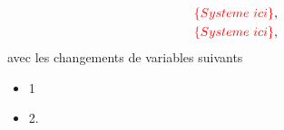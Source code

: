 \begin{subequations}
	\begin{align}
		\textcolor{red}{\{Systeme\ ici\}},\label{eq:1_LottonPoignand}\\
		\textcolor{red}{\{Systeme\ ici\}},\label{eq:2_LottonPoignand}
	\end{align}
	\label{eq:SystemeEq_LottonPoignand}
\end{subequations}
avec les changements de variables suivants

\begin{itemize} \color{red}
	\item 1
	\item 2.
\end{itemize}


